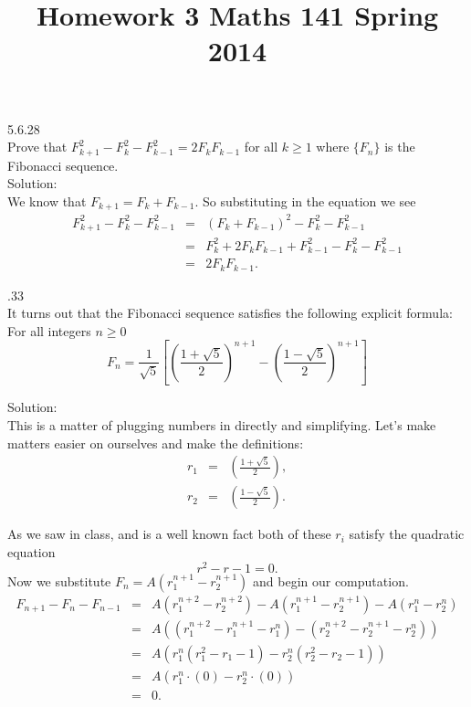 \documentclass[10 pt]{amsart}
\theoremstyle{definition}
\theoremstyle{remark}
\numberwithin{equation}{subsection}
\begin{document}
\title{Homework 3 Maths 141 Spring 2014}
\maketitle 

5.6.28\\
Prove that $F_{k+1}^2 - F_k^2 - F_{k-1}^2 =2F_k F_{k-1}$ for all $k\geq1$ where $\{F_n\}$ is the Fibonacci sequence.\\

Solution:\\
We know that $F_{k+1} = F_k + F_{k-1}$.  So substituting in the equation we see
\begin{eqnarray*}
F_{k+1}^2 - F_k^2 - F_{k-1}^2 & = & (F_k + F_{k-1})^2 - F_k^2 - F_{k-1}^2\\
&=& F_k^2 + 2F_k F_{k-1} + F_{k-1}^2 - F_k^2 - F_{k-1}^2\\
&=& 2F_k F_{k-1}.
\end{eqnarray*} 

.33\\
It turns out that the Fibonacci sequence satisfies the following explicit formula: For all integers $n\geq0$
\[
F_n = \frac{1}{\sqrt{5}}\left[\left(\frac{1+\sqrt{5}}{2}\right)^{n+1}- \left(\frac{1-\sqrt{5}}{2}\right)^{n+1} \right]
\]

Solution:\\
This is a matter of plugging numbers in directly and simplifying.  Let's make matters easier on ourselves and make the definitions:
\begin{eqnarray*}
r_1 &=& \left(\frac{1+\sqrt{5}}{2}\right),\\
r_2 &=&  \left(\frac{1-\sqrt{5}}{2}\right).
\end{eqnarray*}

As we saw in class, and is a well known fact both of these $r_i$ satisfy the quadratic equation
\[
r^2 - r-1=0.
\]
Now we substitute $F_n = A(r_1^{n+1}-r_2^{n+1})$ and begin our computation.\\
\begin{eqnarray*}
F_{n+1} -F_n - F_{n-1} &=& A(r_1^{n+2}-r_2^{n+2}) -A(r_1^{n+1}-r_2^{n+1}) -A(r_1^{n}-r_2^{n})\\
&=& A ((r_1^{n+2} - r_1^{n+1}-r_1^n) - (r_2^{n+2} - r_2^{n+1}-r_2^n))\\
&=& A(r_1^n(r_1^2-r_1-1) - r_2^n(r_2^2-r_2-1))\\
&=& A(r_1^n\cdot(0)-r_2^n\cdot(0))\\
&=&0.
\end{eqnarray*}
\end{document}
